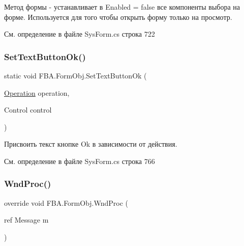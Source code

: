 Метод формы -\/ устанавливает в Enabled = false все компоненты выбора на форме. Используется для того чтобы открыть форму только на просмотр. 

См. определение в файле Sys\+Form.\+cs строка 722

\mbox{\label{class_f_b_a_1_1_form_obj_adbfec2d82d4f37f122d0f910a8545e65}} 
\subsubsection{\texorpdfstring{Set\+Text\+Button\+Ok()}{SetTextButtonOk()}}
{\footnotesize\ttfamily static void F\+B\+A.\+Form\+Obj.\+Set\+Text\+Button\+Ok (\begin{DoxyParamCaption}\item[{\mbox{\hyperlink{namespace_f_b_a_a82a9536170086556d110a52b7698a776}{Operation}}}]{operation,  }\item[{Control}]{control }\end{DoxyParamCaption})\hspace{0.3cm}{\ttfamily [static]}}



Присвоить текст кнопке Ok в зависимости от действия. 



См. определение в файле Sys\+Form.\+cs строка 766

\mbox{\label{class_f_b_a_1_1_form_obj_a5ffeb2c6d68fb5211cf41aef5b4d4e27}} 
\subsubsection{\texorpdfstring{Wnd\+Proc()}{WndProc()}}
{\footnotesize\ttfamily override void F\+B\+A.\+Form\+Obj.\+Wnd\+Proc (\begin{DoxyParamCaption}\item[{ref Message}]{m }\end{DoxyParamCaption})\hspace{0.3cm}{\ttfamily [protected]}}



